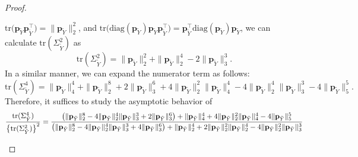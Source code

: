 \documentclass[twoside,11pt]{article}
\newcommand{\rvTwo}{Y}
\newcommand{\probVec}{\mathbf{p}} %
\begin{document}
\begin{appendix}
\begin{proof}
\begin{itemize}
\begin{itemize}
			$
			\mathrm{tr}
			\bigl(
			\probVec_{\tilde{\rvTwo}} \probVec_{\tilde{\rvTwo}}^\top
			\bigr) = \|
			\probVec_{\tilde{\rvTwo}}\|_2^2$,
			and
			$\mathrm{tr}\bigl(\text{diag}(\probVec_{\tilde{\rvTwo}})\probVec_{\tilde{\rvTwo}} \probVec_{\tilde{\rvTwo}}^\top\bigr)
			=
			\probVec_{\tilde{\rvTwo}}^\top \text{diag}(\probVec_{\tilde{\rvTwo}}) \probVec_{\tilde{\rvTwo}}
			$,
			we can calculate $\mathrm{tr}(\Sigma_{\tilde{\rvTwo}}^2)$ as
			\begin{equation*}
				\mathrm{tr}(\Sigma_{\tilde{\rvTwo}}^2)
				=
				\|\probVec_{\tilde{\rvTwo}}\|_2^2
				+
				\|
				\probVec_{\tilde{\rvTwo}}
				\|_2^4
				-
				2
				\|\probVec_{\tilde{\rvTwo}}\|_3^3.
			\end{equation*}
			In a similar manner, we can expand the numerator term as follows:
			\begin{equation*}
				\mathrm{tr}(\Sigma_{\tilde{Y}}^4)
				=
				\|\mathbf{p}_{\tilde{Y}}\|_4^4 + \|\mathbf{p}_{\tilde{Y}}\|_2^8 + 2\|\mathbf{p}_{\tilde{Y}}\|_3^6
				+
				4\|\mathbf{p}_{\tilde{Y}}\|_2^2 \|\mathbf{p}_{\tilde{Y}}\|_4^4
				- 4\|\mathbf{p}_{\tilde{Y}}\|_2^4\|\mathbf{p}_{\tilde{Y}}\|_3^3 - 4\|\mathbf{p}_{\tilde{Y}}\|_5^5.
			\end{equation*}
			Therefore, it suffices to study the asymptotic behavior of
			\begin{equation}\label{trace_ratio_norm_expression}
				\frac{
					\mathrm{tr}(\Sigma_{\tilde{\rvTwo}}^4)
				}{
					\bigl\{
					\mathrm{tr}(\Sigma_{\tilde{\rvTwo}}^2)
					\bigr\}^2   
				}
				=
				\frac{
					\bigl(
					\|\mathbf{p}_{\tilde{{Y}}}\|_2^8
					- 4\|\mathbf{p}_{\tilde{{Y}}}\|_2^4\|\mathbf{p}_{\tilde{{Y}}}\|_3^3
					+ 2\|\mathbf{p}_{\tilde{{Y}}}\|_3^6
					\bigr)
					+
					\|\mathbf{p}_{\tilde{{Y}}}\|_4^4
					+
					4\|\mathbf{p}_{\tilde{{Y}}}\|_2^2 \|\mathbf{p}_{\tilde{{Y}}}\|_4^4
					- 4\|\mathbf{p}_{\tilde{{Y}}}\|_5^5
				}{
					\bigl(
					\|
					\probVec_{\tilde{\rvTwo}}
					\|_2^8
					-
					4
					\|
					\probVec_{\tilde{\rvTwo}}
					\|_2^4
					\|\probVec_{\tilde{\rvTwo}}\|_3^3
					+
					4
					\|\probVec_{\tilde{\rvTwo}}\|_3^6
					\bigr)
					+
					\|\probVec_{\tilde{\rvTwo}}\|_2^4
					+
					2
					\|\probVec_{\tilde{\rvTwo}}\|_2^2
					\|
					\probVec_{\tilde{\rvTwo}}
					\|_2^4
					-
					4
					\|\probVec_{\tilde{\rvTwo}}\|_2^2
					\|\probVec_{\tilde{\rvTwo}}\|_3^3
}
\end{equation}
\end{itemize}
\end{itemize}
\end{proof}
\end{appendix}
\end{document}
